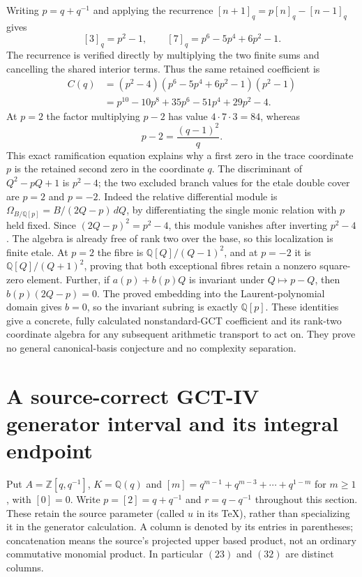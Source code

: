 Writing $p=q+q^{-1}$ and applying the recurrence
$[n+1]_q=p[n]_q-[n-1]_q$ gives
\[
 [3]_q=p^2-1,\qquad [7]_q=p^6-5p^4+6p^2-1.
\]
The recurrence is verified directly by multiplying the two finite
sums and cancelling the shared interior terms.  Thus the same retained
coefficient is
\begin{align*}
 C(q)
  &=(p^2-4)(p^6-5p^4+6p^2-1)(p^2-1)\\
  &=p^{10}-10p^8+35p^6-51p^4+29p^2-4.
\end{align*}
At $p=2$ the factor multiplying $p-2$ has value
$4\cdot7\cdot3=84$, whereas
\[
 p-2=\frac{(q-1)^2}{q}.
\]
This exact ramification equation explains why a first zero in the trace
coordinate $p$ is the retained second zero in the coordinate $q$.
The discriminant of $Q^2-pQ+1$ is $p^2-4$; the two excluded branch
values for the etale double cover are $p=2$ and $p=-2$.
Indeed the relative differential module is
$\Omega_{B/\mathbb Q[p]}=B/(2Q-p)\,dQ$, by differentiating the single
monic relation with $p$ held fixed.  Since $(2Q-p)^2=p^2-4$, this module
vanishes after inverting $p^2-4$.  The algebra is already free of rank
two over the base, so this localization is finite etale.  At $p=2$ the
fibre is $\mathbb Q[Q]/(Q-1)^2$, and at $p=-2$ it is
$\mathbb Q[Q]/(Q+1)^2$, proving that both exceptional fibres retain a
nonzero square-zero element.  Further, if $a(p)+b(p)Q$ is invariant under
$Q\mapsto p-Q$, then $b(p)(2Q-p)=0$.  The proved embedding into the
Laurent-polynomial domain gives $b=0$, so the invariant subring is
exactly $\mathbb Q[p]$.
These identities give a concrete, fully calculated nonstandard-GCT
coefficient and its rank-two coordinate algebra for any subsequent
arithmetic transport to act on.  They prove no general canonical-basis
conjecture and no complexity separation.

\section{A source-correct GCT-IV generator interval and its integral endpoint}
\label{sec:gct-generator-interval}

Put $A=\mathbb Z[q,q^{-1}]$, $K=\mathbb Q(q)$ and
$[m]=q^{m-1}+q^{m-3}+\cdots+q^{1-m}$ for $m\geq1$, with $[0]=0$.
Write $p=[2]=q+q^{-1}$ and $r=q-q^{-1}$ throughout this section.
These retain the source parameter (called $u$ in its TeX), rather than
specializing it in the generator calculation. A column is denoted by
its entries in parentheses; concatenation means the source's projected
upper based product, not an ordinary commutative monomial product.
In particular $(23)$ and $(32)$ are distinct columns.

